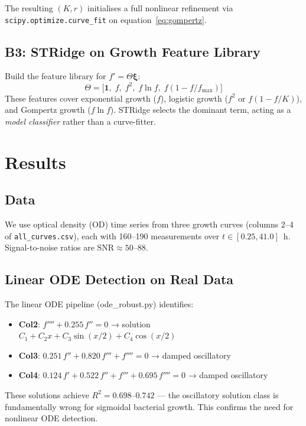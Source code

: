 \documentclass[11pt,a4paper]{article}
\begin{document}
The resulting $(K, r)$ initialises a full nonlinear refinement via
\texttt{scipy.optimize.curve\_fit} on equation~\eqref{eq:gompertz}.

\subsection{B3: STRidge on Growth Feature Library}

Build the feature library for $f' = \Theta \boldsymbol{\xi}$:
\begin{equation}
  \Theta = \bigl[\mathbf{1},\; f,\; f^2,\; f\ln f,\; f(1 - f/f_{\max})\bigr]
\end{equation}
These features cover exponential growth ($f$), logistic growth ($f^2$ or $f(1-f/K)$),
and Gompertz growth ($f\ln f$). STRidge selects the dominant term, acting as a
\emph{model classifier} rather than a curve-fitter.

\section{Results}
\label{sec:results}

\subsection{Data}

We use optical density (OD) time series from three growth curves (columns 2–4 of
\texttt{all\_curves.csv}), each with 160–190 measurements over $t \in [0.25, 41.0]$~h.
Signal-to-noise ratios are $\text{SNR} \approx 50$–88.

\subsection{Linear ODE Detection on Real Data}

The linear ODE pipeline (ode\_robust.py) identifies:
\begin{itemize}
  \item \textbf{Col2}: $f'''' + 0.255\,f'' = 0$ → solution $C_1 + C_2 x + C_3\sin(x/2) + C_4\cos(x/2)$
  \item \textbf{Col3}: $0.251\,f'' + 0.820\,f''' + f'''' = 0$ → damped oscillatory
  \item \textbf{Col4}: $0.124\,f' + 0.522\,f'' + f''' + 0.695\,f'''' = 0$ → damped oscillatory
\end{itemize}
These solutions achieve $R^2 = 0.698$–$0.742$ — the oscillatory solution class is fundamentally
wrong for sigmoidal bacterial growth. This confirms the need for nonlinear ODE detection.
\end{document}
